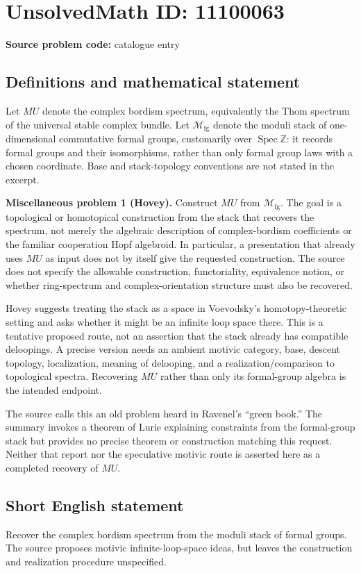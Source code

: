 \documentclass[11pt]{article}
\newcommand{\Z}{\mathbb{Z}}
\begin{document}
\section*{UnsolvedMath ID: 11100063}
\textbf{Source problem code:} catalogue entry
\subsection{Definitions and mathematical statement}
Let $MU$ denote the complex bordism spectrum, equivalently the Thom spectrum of the universal stable complex bundle. Let $\mathcal M_{\mathrm{fg}}$ denote the moduli stack of one-dimensional commutative formal groups, customarily over $\operatorname{Spec}\Z$: it records formal groups and their isomorphisms, rather than only formal group laws with a chosen coordinate. Base and stack-topology conventions are not stated in the excerpt.

\textbf{Miscellaneous problem 1 (Hovey).} Construct $MU$ from $\mathcal M_{\mathrm{fg}}$. The goal is a topological or homotopical construction from the stack that recovers the spectrum, not merely the algebraic description of complex-bordism coefficients or the familiar cooperation Hopf algebroid. In particular, a presentation that already uses $MU$ as input does not by itself give the requested construction. The source does not specify the allowable construction, functoriality, equivalence notion, or whether ring-spectrum and complex-orientation structure must also be recovered.

Hovey suggests treating the stack as a space in Voevodsky's homotopy-theoretic setting and asks whether it might be an infinite loop space there. This is a tentative proposed route, not an assertion that the stack already has compatible deloopings. A precise version needs an ambient motivic category, base, descent topology, localization, meaning of delooping, and a realization/comparison to topological spectra. Recovering $MU$ rather than only its formal-group algebra is the intended endpoint.

The source calls this an old problem heard in Ravenel's ``green book.'' The summary invokes a theorem of Lurie explaining constraints from the formal-group stack but provides no precise theorem or construction matching this request. Neither that report nor the speculative motivic route is asserted here as a completed recovery of $MU$.
\subsection{Short English statement}
Recover the complex bordism spectrum from the moduli stack of formal groups. The source proposes motivic infinite-loop-space ideas, but leaves the construction and realization procedure unspecified.
\end{document}
